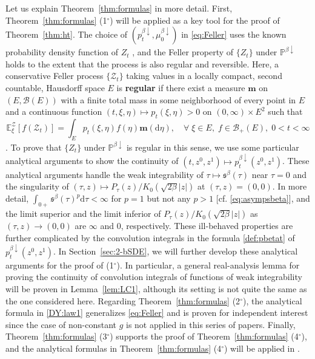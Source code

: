 \documentclass[12pt, twoside]{article}
\numberwithin{figure}{section}
\newcommand{\1}{\mathds 1}
\newcommand{\B}{\mathscr B}
\newcommand{\da}{{\downarrow}}
\renewcommand{\P}{{\mathbb P}}
\newcommand{\E}{{\mathbb E}}
\newcommand{\mc}{\mathcal}
\renewcommand{\d}{{\mathrm d}}
\newcommand{\2}{{\mathbf 1}}
\newcommand{\s}{{\mathfrak s}}
\newcommand{\cc}{{^\circ}}
\begin{document}
Let us explain Theorem~\ref{thm:formulas} in more detail. First, Theorem~\ref{thm:formulas} (1$\cc$) will be applied as a key tool for the proof of Theorem~\ref{thm:ht}. The choice of $(p^{\beta\da }_t,\mu^{\beta\da}_0)$ in \eqref{eq:Feller} uses the known probability density function of $Z_t$ \cite[Theorem~2.10]{C:BES}, and the Feller property of $\{Z_t\}$ under $\P^{\beta\da}$ holds to the extent that the process is also regular and reversible. Here, a conservative Feller process $\{\mathcal Z_t\}$ taking values in a locally compact, second countable, Hausdorff space $E$ is {\bf regular} if there exist a measure $\mathbf m$ on $(E,\B(E))$ with a finite total mass in some neighborhood of every point in $E$ and  a continuous function $(t,\xi,\eta)\mapsto p_t(\xi,\eta)>0$ on $(0,\infty)\times E^2$  
such that
\[	
\E_\xi^\mathcal Z[f(\mc Z_t)]=\int_E p_t(\xi,\eta)f(\eta)\mathbf m(\d \eta),\quad \forall\; \xi\in E,\;f\in\B_+(E),\;0<t<\infty
\]
 \cite[p.9 and p.399]{K:FMP}. To prove that $\{Z_t\}$ under $\P^{\beta\da}$ is regular in this sense, we use some particular analytical arguments to show the continuity of $(t,z^0,z^1)\mapsto p^{\beta\da }_{t}(z^0,z^1)$. These analytical arguments handle the weak integrability of $\tau\mapsto \s^\beta(\tau)$ near $\tau=0$ and the singularity of $(\tau,z)\mapsto P_\tau(z)/K_0(\sqrt{2\beta}|z|)$ at $(\tau,z)=(0,0)$. 
In more detail, $\int_{0+}\s^\beta(\tau)^p\d \tau<\infty$ for $p=1$ but not any $p>1$ [cf. \eqref{eq:asympsbeta}], and the limit superior and the limit inferior of $P_\tau(z)/K_0(\sqrt{2\beta}|z|)$ as $(\tau,z)\to (0,0)$ are $\infty$ and $0$, respectively. These ill-behaved properties are further complicated by the convolution integrals in the formula \eqref{def:pbetat} of $p^{\beta\da}_t(z^0,z^1)$. In Section~\ref{sec:2-bSDE}, we will further develop these analytical arguments for the proof of (1$\cc$). In particular, a general real-analysis lemma for proving the continuity of convolution integrals of functions of weak integrability will be proven in Lemma~\ref{lem:LC1}, although its setting is not quite the same as the one considered here. Regarding Theorem~\ref{thm:formulas} (2$\cc$), the analytical formula in \eqref{DY:law1} generalizes \eqref{eq:Feller} and is proven for independent interest since the case of non-constant $g$ is not applied in this series of papers. Finally, Theorem~\ref{thm:formulas} (3$\cc$) supports the proof of Theorem~\ref{thm:formulas} (4$\cc$), and the analytical formulas in Theorem~\ref{thm:formulas} (4$\cc$) will be applied in \cite{C:SDBG2,C:SDBG3}. 
\end{document}
